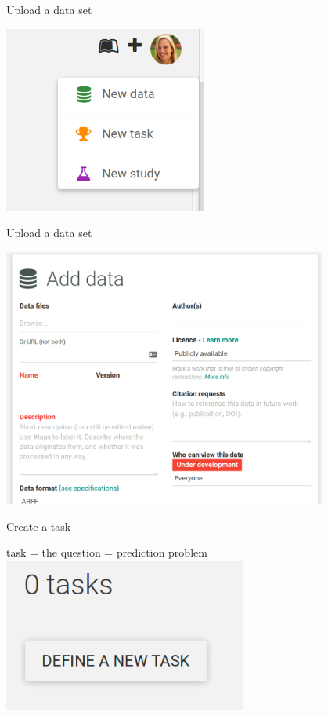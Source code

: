 \documentclass{beamer}
\begin{document}
\begin{frame}[fragile]{Upload a data set}
\begin{center}
\includegraphics[width = 0.5\textwidth]{add}
\end{center}
\end{frame}

\begin{frame}[fragile]{Upload a data set}
\begin{center}
\includegraphics[width = 0.8\textwidth]{add_data}
\end{center}
\end{frame}

\begin{frame}[fragile]{Create a task}
\begin{center}
task = the question = prediction problem\\[2em]
\includegraphics[width = 0.6\textwidth]{add_task}
\end{center}
\end{frame}
\end{document}
